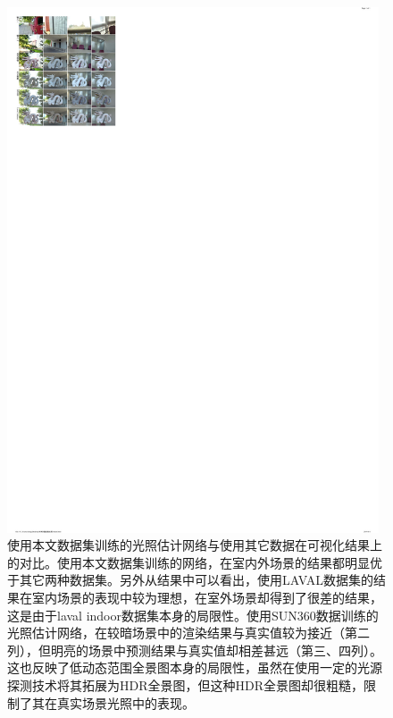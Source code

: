 \begin{figure}[!htbp]
    \centering
    \includegraphics[width=0.98\textwidth]{Img/eval-data-previous.pdf}
    \caption[本文数据集与其它工作的可视化结果比较]
    {使用本文数据集训练的光照估计网络与使用其它数据在可视化结果上的对比。使用本文数据集训练的网络，在室内外场景的结果都明显优于其它两种数据集。另外从结果中可以看出，使用LAVAL数据集的结果在室内场景的表现中较为理想，在室外场景却得到了很差的结果，这是由于laval indoor数据集本身的局限性。使用SUN360数据训练的光照估计网络，在较暗场景中的渲染结果与真实值较为接近（第二列），但明亮的场景中预测结果与真实值却相差甚远（第三、四列）。这也反映了低动态范围全景图本身的局限性，虽然在使用一定的光源探测技术将其拓展为HDR全景图，但这种HDR全景图却很粗糙，限制了其在真实场景光照中的表现。}
    \label{fig:eval-data-previous}
\end{figure}